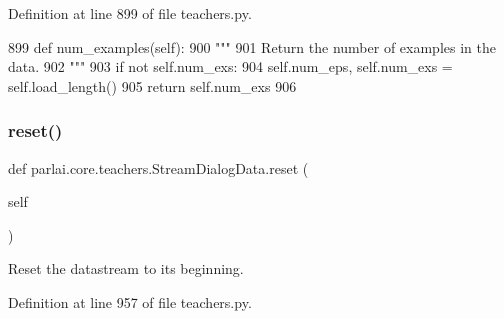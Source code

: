 Definition at line 899 of file teachers.\+py.


\begin{DoxyCode}
899     \textcolor{keyword}{def }num\_examples(self):
900         \textcolor{stringliteral}{"""}
901 \textcolor{stringliteral}{        Return the number of examples in the data.}
902 \textcolor{stringliteral}{        """}
903         \textcolor{keywordflow}{if} \textcolor{keywordflow}{not} self.num\_exs:
904             self.num\_eps, self.num\_exs = self.load\_length()
905         \textcolor{keywordflow}{return} self.num\_exs
906 
\end{DoxyCode}
\mbox{\label{classparlai_1_1core_1_1teachers_1_1StreamDialogData_a6375bd13d685da4b3449caaafcc5ec13}} 
\subsubsection{\texorpdfstring{reset()}{reset()}}
{\footnotesize\ttfamily def parlai.\+core.\+teachers.\+Stream\+Dialog\+Data.\+reset (\begin{DoxyParamCaption}\item[{}]{self }\end{DoxyParamCaption})}

\begin{DoxyVerb}Reset the datastream to its beginning.
\end{DoxyVerb}
 

Definition at line 957 of file teachers.\+py.


